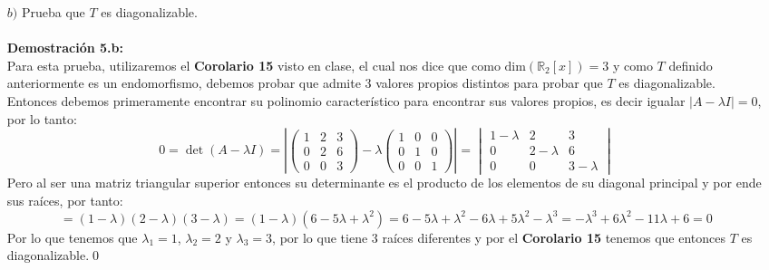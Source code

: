 \begin{itemize}
\item[$b)$]Prueba que $T$ es diagonalizable.\\\\
\textbf{Demostraci\'on 5.b:}\\
Para esta prueba, utilizaremos el \textbf{Corolario 15} visto en clase, el cual nos dice que como $\text{dim}(\mathbb{R}_2[x]) = 3$ y como $T$ definido anteriormente es un endomorfismo, debemos probar que admite $3$ valores propios distintos para probar que $T$ es
diagonalizable.\\
Entonces debemos primeramente encontrar su polinomio caracter\'istico para encontrar sus valores propios, es decir igualar $|A-\lambda I|=0$, por lo tanto:
\[0=\det(A-\lambda I)=\left|\begin{pmatrix}
    1 & 2 & 3\\
    0 & 2 & 6\\
    0 & 0 & 3\end{pmatrix}-\lambda \begin{pmatrix}
    1 & 0 & 0\\
    0 & 1 & 0\\
    0 & 0 & 1\end{pmatrix}\right|=\begin{vmatrix}
    1-\lambda & 2 & 3\\
    0 & 2-\lambda & 6\\
    0 & 0 & 3-\lambda\end{vmatrix}\]
    Pero al ser una matriz triangular superior entonces su determinante es el producto de los elementos de su diagonal principal y por ende sus ra\'ices, por tanto:
    \[=(1-\lambda)(2-\lambda)(3-\lambda)=(1-\lambda)(6-5\lambda+\lambda^2)=6-5\lambda+\lambda^2-6\lambda+5\lambda^2-\lambda^3=-\lambda^3+6\lambda^2-11\lambda+6=0\]
    Por lo que tenemos que $\lambda_1=1$, $\lambda_2=2$ y $\lambda_3=3$, por lo que tiene $3$ ra\'ices diferentes y por el \textbf{Corolario 15} tenemos que entonces $T$ es diagonalizable.\qed




\end{itemize}
